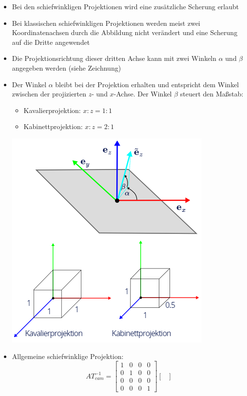 \documentclass{scrartcl}
\begin{document}
\begin{itemize}
	\item Bei den schiefwinkligen Projektionen wird eine zusätzliche Scherung erlaubt
	\item Bei klassischen schiefwinkligen Projektionen werden meist zwei Koordinatenachsen durch die Abbildung nicht verändert und eine Scherung auf die Dritte angewendet
	\item Die Projektionsrichtung dieser dritten Achse kann mit zwei Winkeln $\alpha$ und $\beta$ angegeben werden (siehe Zeichnung)
	\item Der Winkel $\alpha$ bleibt bei der Projektion erhalten und entspricht dem Winkel zwischen der projizierten $z$- und $x$-Achse. Der Winkel $\beta$ steuert den Maßstab:
	\begin{itemize}
		\item Kavalierprojektion: $x : z = 1:1$
		\item Kabinettprojektion: $x : z = 2 : 1$
	\end{itemize}
	\includegraphics[scale=0.5]{figures/oblique.png}
	\item Allgemeine schiefwinklige Projektion:
	\begin{equation}
		AT_{cam}^{-1} = \begin{bmatrix}
		1 & 0 & 0 & 0 \\
		0 & 1 & 0 & 0 \\
		0 & 0 & 0 & 0 \\
		0 & 0 & 0 & 1
		\end{bmatrix} \begin{bmatrix}

\end{bmatrix}
\end{equation}
\end{itemize}
\end{document}
